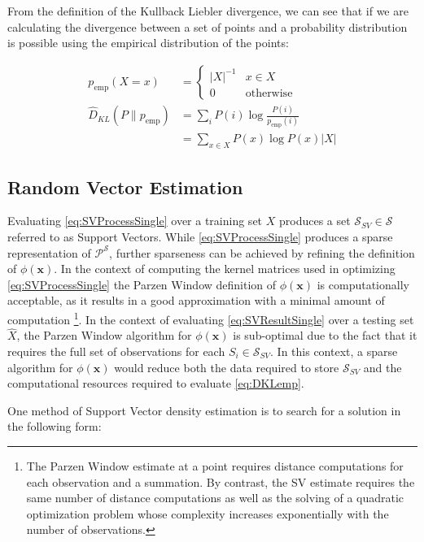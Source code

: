 \documentclass[10pt]{article}
\begin{document}
From the definition of the Kullback Liebler divergence, we can see that if we are calculating the divergence between a set of points and a probability distribution is possible using the empirical distribution of the points:

\begin{align}
p_{\text{emp}}(X = x) &= \begin{cases} |X|^{-1} & x \in X \\ 0 & \text{otherwise} \end{cases} \\
\hat{D}_{KL}(P\|p_{\text{emp}}) &= \sum_i P(i) \log \frac{ P(i) }{ p_{\text{emp}}(i) } \nonumber \\
&= \sum_{x \in X} P(x) \log P(x) |X|  \label{eq:DKLemp}
\end{align}


\subsection{ Random Vector Estimation }
 
Evaluating \ref{eq:SVProcessSingle} over a training set \( X \) produces a set \( \mathcal{S}_{SV} \in \mathcal{S} \) referred to as Support Vectors.  While \ref{eq:SVProcessSingle} produces a sparse representation of \( \mathcal{P}^\mathcal{S} \), further sparseness can be achieved by refining the definition of \( \phi(\mathbf{x}) \).  In the context of computing the kernel matrices used in optimizing \ref{eq:SVProcessSingle} the Parzen Window definition of \( \phi(\mathbf{x}) \) is computationally acceptable, as it results in a good approximation with a minimal amount of computation \footnote{ The Parzen Window estimate at a point requires distance computations for each observation and a summation.  By contrast, the SV estimate requires the same number of distance computations as well as the solving of a quadratic optimization problem whose complexity increases exponentially with the number of observations. }.  In the context of evaluating \ref{eq:SVResultSingle} over a testing set \( \hat{X} \), the Parzen Window algorithm for \( \phi(\mathbf{x}) \) is sub-optimal due to the fact that it requires the full set of observations for each \( S_i \in \mathcal{S}_{SV} \).  In this context, a sparse algorithm for \( \phi(\mathbf{x}) \) would reduce both the data required to store \( \mathcal{S}_{SV} \) and the computational resources required to evaluate \ref{eq:DKLemp}.

One method of Support Vector density estimation is to search for a solution in the following form:
\end{document}
